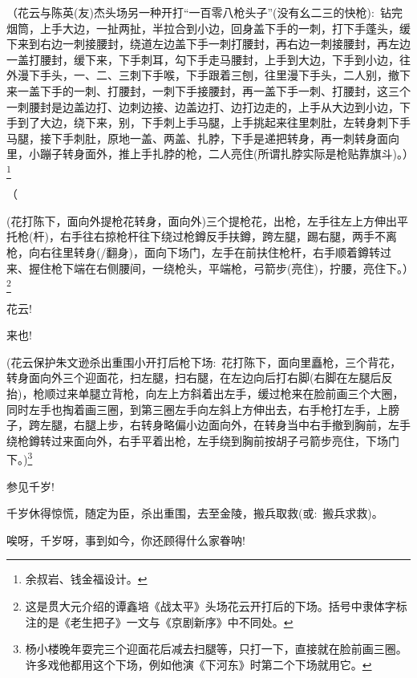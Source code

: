 （{花云与陈英(友)杰头场另一种开打``一百零八枪头子''}({没有幺二三的快枪}):~钻完烟筒，上手大边，一扯两扯，半拉合到小边，回身盖下手的一刺，打下手蓬头，缓下来到右边一刺接腰封，绕道左边盖下手一刺打腰封，再右边一刺接腰封，再左边一盖打腰封，缓下来，下手刺耳，勾下手走马腰封，上手到大边，下手到小边，往外漫下手头，一、二、三刺下手喉，下手跟着三刨，往里漫下手头，二人别，撤下来一盖下手的一刺、打腰封，一刺下手接腰封，再一盖下手一刺、打腰封，这三个一刺腰封是边盖边打、边刺边接、边盖边打、边打边走的，上手从大边到小边，下手到了大边，绕下来，别，下手刺上手马腿，上手挑起来往里刺肚，左转身刺下手马腿，接下手刺肚，原地一盖、两盖、扎脖，下手是递把转身，再一刺转身面向里，小蹦子转身面外，推上手扎脖的枪，二人亮住(所谓扎脖实际是枪贴靠旗斗)。）\footnote{余叔岩、钱金福设计。}

（

(花打陈下，面向外提枪花转身，面向外)三个提枪花，出枪，左手往左上方伸出平托枪(杆)，右手往右掠枪杆往下绕过枪鐏反手扶鐏，跨左腿，踢右腿，两手不离枪，向右往里转身(/翻身)，面向下场门，左手在前扶住枪杆，右手顺着鐏转过来、握住枪下端在右侧腰间，一绕枪头，平端枪，弓箭步(亮住)，拧腰，亮住下。）\footnote{这是贯大元介绍的谭鑫培《战太平》头场花云开打后的下场。括号中隶体字标注的是《老生把子》一文与《京剧新序》中不同处。}

{\vspace{5pt}}

{花云!}

{来也!}

({花云保护朱文逊杀出重围小开打后枪下场:~}花打陈下，面向里矗枪，三个背花，转身面向外三个迎面花，扫左腿，扫右腿，在左边向后打右脚(右脚在左腿后反抬)，枪顺过来单腿立背枪，向左上方斜着出左手，缓过枪来在脸前画三个大圈，同时左手也掏着画三圈，到第三圈左手向左斜上方伸出去，右手枪打左手，上膀子，跨左腿，右腿上步，右转身略偏小边面向外，在转身当中右手撤到胸前，左手绕枪鐏转过来面向外，右手平着出枪，左手绕到胸前按胡子弓箭步亮住，下场门下。)\footnote{杨小楼晚年耍完三个迎面花后减去扫腿等，只打一下，直接就在脸前画三圈。许多戏他都用这个下场，例如他演《下河东》时第二个下场就用它。}

{\vspace{5pt}}

{参见千岁!}

{千岁休得惊慌，随定为臣，杀出重围，去至金陵，搬兵取救({\akai 或}:~搬兵求救)。}

{唉呀，千岁呀，事到如今，你还顾得什么家眷呐!}

